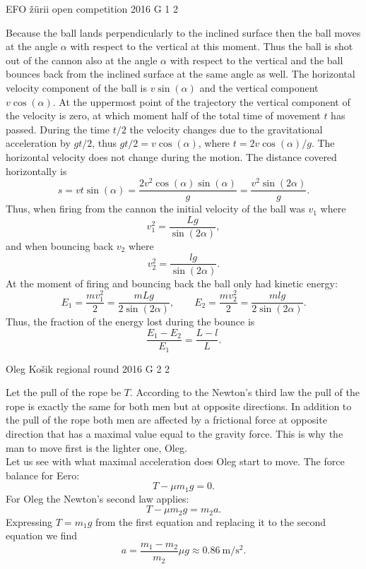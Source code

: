 \documentclass[11pt]{article}
\begin{document}
{EFO žürii} %
{open competition} %
{2016} %
{G 1} %
{2} %
{

\ifEngSolution
Because the ball lands perpendicularly to the inclined surface then the ball moves at the angle $\alpha$ with respect to the vertical at this moment. Thus the ball is shot out of the cannon also at the angle $\alpha$ with respect to the vertical and the ball bounces back from the inclined surface at the same angle as well. The horizontal velocity component of the ball is $v\sin(\alpha)$ and the vertical component $v\cos(\alpha)$. At the uppermost point of the trajectory the vertical component of the velocity is zero, at which moment half of the total time of movement $t$ has passed. During the time $t/2$ the velocity changes due to the gravitational acceleration by $gt/2$, thus $gt/2 =v\cos(\alpha)$, where $t=2v\cos(\alpha)/g$. The horizontal velocity does not change during the motion. The distance covered horizontally is
$$s=vt\sin(\alpha)=\frac{2v^2\cos(\alpha)\sin(\alpha)}{g} = \frac{v^2\sin(2\alpha)}{g}.$$ 
Thus, when firing from the cannon the initial velocity of the ball was $v_1$ where
\[ v_1^2 = \frac{Lg}{\sin(2\alpha)}, \] 
and when bouncing back $v_2$ where
\[ v_2^2 = \frac{lg}{\sin(2\alpha)}. \] 
At the moment of firing and bouncing back the ball only had kinetic energy:
\[ E_1 = \frac{mv_1^2}{2}=\frac{mLg}{2\sin(2\alpha)},\quad\quad E_2 =\frac{mv_2^2}{2} = \frac{mlg}{2\sin(2\alpha)}. \]
Thus, the fraction of the energy lost during the bounce is
\[ \frac{E_1-E_2}{E_1} = \frac{L-l}{L}. \]
\fi
}

{Oleg Košik} %
{regional round} %
{2016} %
{G 2} %
{2} %
{

\ifEngSolution
Let the pull of the rope be $T$. According to the Newton’s third law the pull of the rope is exactly the same for both men but at opposite directions. In addition to the pull of the rope both men are affected by a frictional force at opposite direction that has a maximal value equal to the gravity force. This is why the man to move first is the lighter one, Oleg.\\
Let us see with what maximal acceleration does Oleg start to move. The force balance for Eero:
\[
T-\mu m_1g = 0.
\]
For Oleg the Newton’s second law applies:
\[
T-\mu m_2g = m_2a.
\]
Expressing $T=m_1g$ from the first equation and replacing it to the second equation we find
\[
a = \frac{m_1-m_2}{m_2}\mu g \approx \SI{0,86}{\meter \per \second\squared}.
\]
\fi
}
\end{document}
